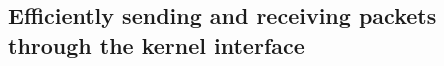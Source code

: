 \documentclass[11pt,a4paper,british]{bhamarticle}
\begin{document}
\subsection{Efficiently sending and receiving packets through the kernel interface}
\cite{tpacket} %


\printbibliography %
\end{document}
